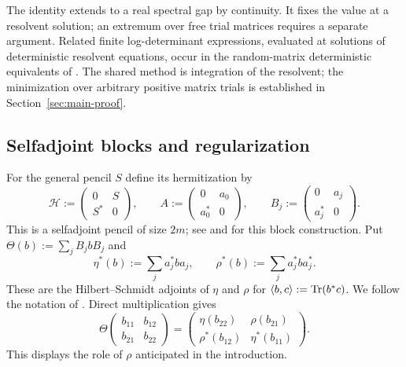 The identity extends to a real spectral gap by continuity.
It fixes the value at a resolvent solution; an extremum over free trial matrices requires a separate argument.
Related finite log-determinant expressions, evaluated at solutions of deterministic resolvent equations, occur in the random-matrix deterministic equivalents of \cite[Theorem 4.1]{HLN07}.
The shared method is integration of the resolvent; the minimization over arbitrary positive matrix trials is established in Section~\ref{sec:main-proof}.

\subsection{Selfadjoint blocks and regularization}\label{subsec:hermitization}
For the general pencil $S$ define its hermitization by
\begin{equation}\label{eq:hermitization}
 \mathscr H:=\begin{pmatrix}0&S\\S^*&0\end{pmatrix},\qquad
 A:=\begin{pmatrix}0&a_0\\a_0^*&0\end{pmatrix},\qquad
 B_j:=\begin{pmatrix}0&a_j\\a_j^*&0\end{pmatrix}.
\end{equation}
This is a selfadjoint pencil of size $2m$; see \cite[Section 3]{MS24} and \cite[Chapter 11, Section 9]{MS17} for this block construction.
Put $\Theta(b):=\sum_jB_jbB_j$ and
\[
 \eta^*(b):=\sum_j a_j^*ba_j,\qquad
 \rho^*(b):=\sum_j a_j^*ba_j^*.
\]
These are the Hilbert--Schmidt adjoints of $\eta$ and $\rho$ for $\langle b,c\rangle:=\operatorname{Tr}(b^*c)$.
We follow the notation of \cite[Lemma 3.5(ii)]{MS24}.
Direct multiplication gives
\begin{equation}\label{eq:full-covariance}
 \Theta\begin{pmatrix}b_{11}&b_{12}\\b_{21}&b_{22}\end{pmatrix}
 =\begin{pmatrix}\eta(b_{22})&\rho(b_{21})\\
                  \rho^*(b_{12})&\eta^*(b_{11})\end{pmatrix}.
\end{equation}
This displays the role of $\rho$ anticipated in the introduction.

